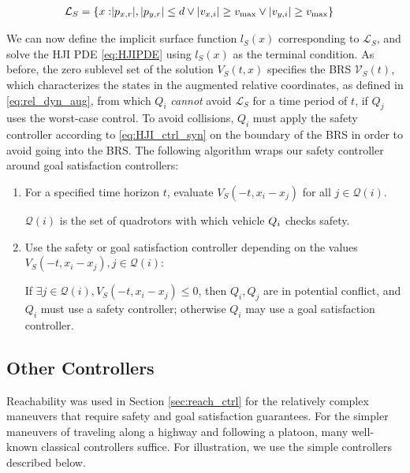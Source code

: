 \begin{equation}
\begin{aligned}
\mathcal{L}_S = \{x: &|p_{x,r}|, |p_{y,r}|\le d \vee |v_{x,i}| \ge v_\text{max} \vee |v_{y,i}| \ge v_\text{max} \}
\end{aligned}
\end{equation}

We can now define the implicit surface function $l_S(x)$ corresponding to $\mathcal{L}_S$, and solve the HJI PDE \eqref{eq:HJIPDE} using $l_S(x)$ as the terminal condition. As before, the zero sublevel set of the solution $V_S(t,x)$ specifies the BRS $\mathcal{V}_S(t)$, which characterizes the states in the augmented relative coordinates, as defined in \eqref{eq:rel_dyn_aug}, from which $Q_i$ \textit{cannot} avoid $\mathcal{L}_S$ for a time period of $t$, if $Q_j$ uses the worst-case control. To avoid collisions, $Q_i$ must apply the safety controller according to \eqref{eq:HJI_ctrl_syn} on the boundary of the BRS in order to avoid going into the BRS. The following algorithm wraps our safety controller around goal satisfaction controllers:

\begin{enumerate}
\item For a specified time horizon $t$, evaluate $V_S(-t,x_i-x_j)$ for all $j\in \mathcal{Q}(i)$.

$\mathcal{Q}(i)$ is the set of quadrotors with which vehicle $Q_{i}$ checks safety.
\item Use the safety or goal satisfaction controller depending on the values $V_S(-t,x_i-x_j),j\in \mathcal{Q}(i)$: 

If $\exists j\in \mathcal{Q}(i),V_S(-t,x_i-x_j)\le 0$, then $Q_i,Q_j$ are in potential conflict, and $Q_i$ must use a safety controller; otherwise $Q_i$ may use a goal satisfaction controller.
\end{enumerate}

\subsection{Other Controllers \label{sec:other_ctrl}}
Reachability was used in Section \ref{sec:reach_ctrl} for the relatively complex maneuvers that require safety and goal satisfaction guarantees. For the simpler maneuvers of traveling along a highway and following a platoon, many well-known classical controllers suffice. For illustration, we use the simple controllers described below.

